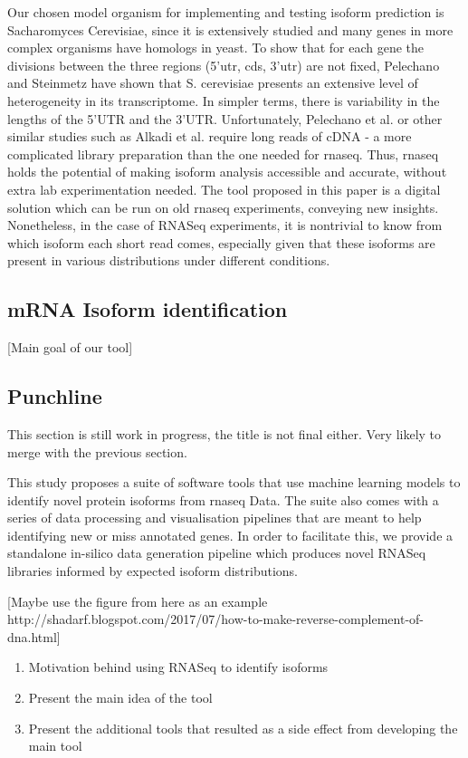 \documentclass[12pt]{article}
\begin{document}
Our chosen model organism for implementing and testing isoform prediction is Sacharomyces Cerevisiae, since it is extensively studied and many genes in more complex organisms have homologs in yeast. To show that for each gene the divisions between the three regions (5'\acrshort{utr}, \acrshort{cds}, 3'\acrshort{utr}) are not fixed, Pelechano and Steinmetz \cite{Pelechano2013} have shown that S. cerevisiae presents an extensive level of heterogeneity in its transcriptome. In simpler terms, there is variability in the lengths of the 5’UTR and the 3’UTR. Unfortunately, Pelechano et al. \cite{Pelechano2013} or other similar studies such as Alkadi et al. \cite{Alkadi2020} require long reads of cDNA - a more complicated library preparation than the one needed for \acrshort{rnaseq}. Thus, \acrshort{rnaseq} holds the potential of making isoform analysis accessible and accurate, without extra lab experimentation needed. The tool proposed in this paper is a digital solution which can be run on old \acrshort{rnaseq} experiments, conveying new insights. Nonetheless, in the case of RNASeq experiments, it is nontrivial to know from which isoform each short read comes, especially given that these isoforms are present in various distributions under different conditions. 

\subsection{mRNA Isoform  identification }
[Main goal of our tool]
\subsection{Punchline} 

This section is still work in progress, the title is not final either. Very likely to merge with the previous section.

This study proposes a suite of software tools that use machine learning models to identify novel protein isoforms from \gls{rnaseq} Data. The suite also comes with a series of data processing and visualisation pipelines that are meant to help identifying new or miss annotated genes. In order to facilitate this, we provide a standalone in-silico data generation pipeline which produces novel RNASeq libraries informed by expected isoform distributions. 

[Maybe use the figure from here as an example http://shadarf.blogspot.com/2017/07/how-to-make-reverse-complement-of-dna.html]


\begin{enumerate}
  
    \item Motivation behind using RNASeq to identify isoforms
    \item Present the main idea of the tool
    \item Present  the additional tools that resulted as a side effect from developing the main tool

\end{enumerate}
\end{document}
